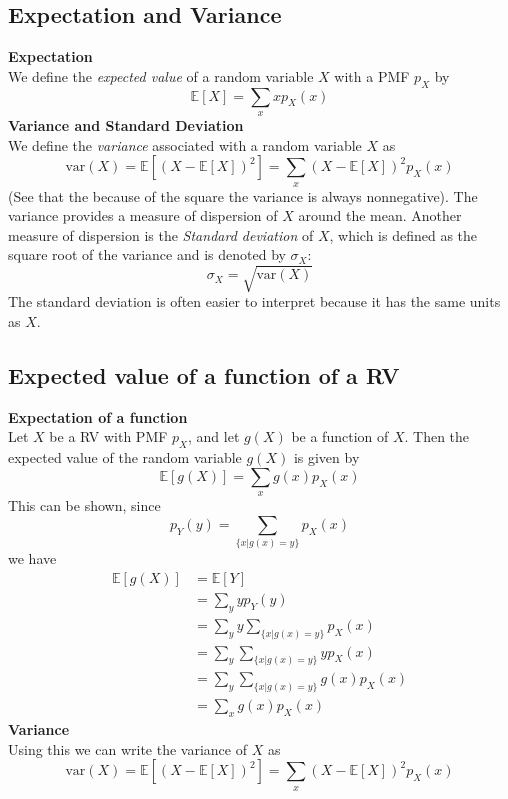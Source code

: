 \documentclass{report}
\begin{document}
\subsection{Expectation and Variance}
\textbf{Expectation}\\
We define the \textit{expected value} of a random variable $X$ with a PMF $p_X$ by
\begin{equation*}
\boxed{\mathbb{E}[X]=\sum_xxp_X(x)}
\end{equation*}
\textbf{Variance and Standard Deviation}\\
We define the \textit{variance} associated with a random variable $X$ as
\begin{equation*}
\boxed{\text{var}(X)=\mathbb{E}\left[(X-\mathbb{E}[X])^2\right]=\sum_x(X-\mathbb{E}[X])^2p_X(x)}
\end{equation*}
(See that the because of the square the variance is always nonnegative). The variance provides a measure of
dispersion of $X$ around the mean. Another measure of dispersion is the \textit{Standard deviation} of $X$, which 
is defined as the square root of the variance and is denoted by $\sigma_X$:
\begin{equation*}
\boxed{\sigma_X=\sqrt{\text{var}(X)}}
\end{equation*}
The standard deviation is often easier to interpret because it has the same units as $X$.
\newpage

\subsection{Expected value of a function of a RV}
\textbf{Expectation of a function}\\
Let $X$ be a RV with PMF $p_X$, and let $g(X)$ be a function of $X$. Then the expected value
of the random variable $g(X)$ is given by
\begin{equation*}
\boxed{\mathbb{E}[g(X)]=\sum_xg(x)p_X(x)}
\end{equation*}
This can be shown, since
\begin{equation*}
p_Y(y)=\sum_{\{x|g(x)=y\}}p_X(x)
\end{equation*}
we have
\begin{align*}
\mathbb{E}[g(X)]&=\mathbb{E}[Y]\\
&=\sum_yyp_Y(y)\\
&=\sum_yy\sum_{\{x|g(x)=y\}}p_X(x)\\
&=\sum_y\sum_{\{x|g(x)=y\}}yp_X(x)\\
&=\sum_y\sum_{\{x|g(x)=y\}}g(x)p_X(x)\\
&=\sum_xg(x)p_X(x)
\end{align*}
\textbf{Variance}\\
Using this we can write the variance of $X$ as
\begin{equation*}
\text{var}(X)=\mathbb{E}\left[(X-\mathbb{E}[X])^2\right]
=\sum_x(X-\mathbb{E}[X])^2p_X(x)
\end{equation*}
\newpage
\end{document}
